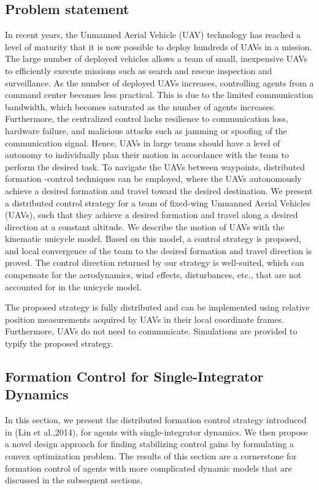 \documentclass[10pt]{article}
\begin{document}
\subsection{Problem statement}
In recent years, the Unmanned Aerial Vehicle (UAV) technology has reached a level of maturity that it is now possible to deploy hundreds of UAVs in a mission. The large number of deployed vehicles allows a team of small, inexpensive UAVs to efficiently execute missions such as search and rescue inspection and surveillance. As the number of deployed UAVs increases, controlling agents from a command center becomes less practical. This is due to the limited communication bandwidth, which becomes saturated as the number of agents increases. Furthermore, the centralized control lacks resilience to communication loss, hardware failure, and malicious attacks such as jamming or spoofing of the communication signal. Hence, UAVs in large teams should have a level of autonomy to individually plan their motion in accordance with the team to perform the desired task. To navigate the UAVs between waypoints, distributed formation -control techniques can be employed, where the UAVs autonomously achieve a desired formation and travel toward the desired destination. We present a distributed control strategy for a team of fixed-wing Unmanned Aerial Vehicles (UAVs), such that they achieve a desired formation and travel along a desired direction at a constant altitude. We describe the motion of UAVs with the kinematic unicycle model. Based on this model, a control strategy is proposed, and local convergence of the team to the desired formation and travel direction is proved. The control direction returned by our strategy is well-suited, which can compensate for the aerodynamics, wind effects, disturbances, etc., that are not accounted for in the unicycle model.

The proposed strategy is fully distributed and can be implemented using relative position measurements acquired by UAVs in their local coordinate frames. Furthermore, UAVs do not need to communicate. Simulations are provided to typify the proposed strategy.

\subsection{Formation Control for Single-Integrator Dynamics}
In this section, we present the distributed formation control strategy introduced in (Lin et al.,2014), for agents with single-integrator dynamics. We then propose a novel design approach for finding stabilizing control gains by formulating a convex optimization problem. The results of this section are a cornerstone for formation control of agents with more complicated dynamic models that are discussed in the subsequent sections.
\end{document}
